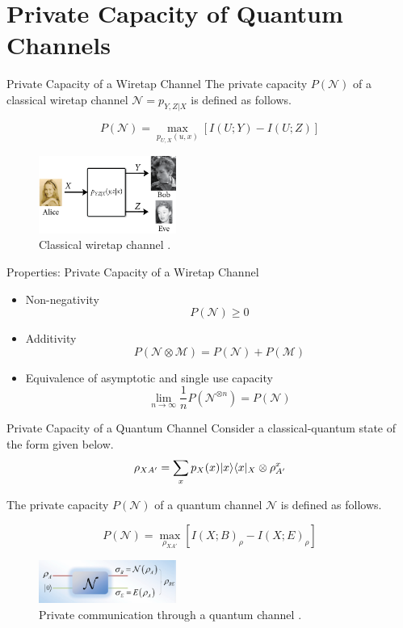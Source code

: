 \section{Private Capacity of Quantum Channels}

\begin{frame}{Private Capacity of a Wiretap Channel}
The private capacity $P(\mathcal{N})$ of a classical wiretap channel $\mathcal{N} = p_{Y,Z|X}$ is defined as follows.
\begin{tcolorbox}
$$P(\mathcal{N}) = \max_{p_{U,X}(u,x)} \left[ I(U;Y) - I(U;Z) \right]$$
\end{tcolorbox}

\begin{figure}
    \includegraphics[width=0.4\textwidth]{figures/private_communication_wiretap_channel.png}
    \caption{Classical wiretap channel \cite{Wilde_2016}.}
\end{figure}
\end{frame}

\begin{frame}{Properties: Private Capacity of a Wiretap Channel}
\begin{itemize}
    \setlength{\itemsep}{1.5em}
    \item Non-negativity
    $$P(\mathcal{N}) \geq 0$$
    \item Additivity
    $$P(\mathcal{N} \otimes \mathcal{M}) = P(\mathcal{N}) + P(\mathcal{M})$$
    \item Equivalence of asymptotic and single use capacity
    $$\lim_{n \rightarrow \infty} \frac{1}{n} P(\mathcal{N}^{\otimes n}) = P(\mathcal{N})$$
\end{itemize}
\end{frame}

\begin{frame}{Private Capacity of a Quantum Channel}
Consider a classical-quantum state of the form given below.
$$\rho_{XA'} = \sum_{x} p_X(x) \lvert x\rangle\langle x\rvert_X \otimes \rho_{A'}^x $$

The private capacity $P(\mathcal{N})$ of a quantum channel $\mathcal{N}$ is defined as follows.
\begin{tcolorbox}
$$P(\mathcal{N}) = \max_{\rho_{XA'}} \left[ I(X;B)_\rho - I(X;E)_\rho \right]$$
\end{tcolorbox}

\begin{figure}
    \includegraphics[width=0.4\textwidth]{figures/private_communication_quantum_channel.png}
    \caption{Private communication through a quantum channel \cite{Gyongyosi_2018}.}
\end{figure}
\end{frame}

